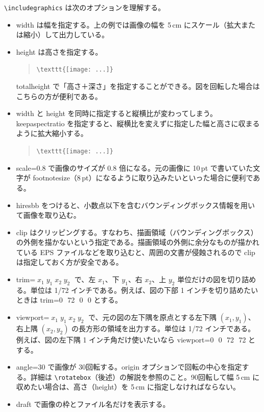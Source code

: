 \verb`\includegraphics` は次のオプションを理解する。
\begin{itemize}\setlength{\leftskip}{-1.00zw}%
\item width は幅を指定する。上の例では画像の幅を 5\,cm にスケール（拡大または縮小）して出力している。
\item height は高さを指定する。
  \begin{quote}
    \verb'\texttt{[image: ...]}'
  \end{quote}
  totalheight で「高さ＋深さ」を指定することができる。図を回転した場合はこちらの方が便利である。
\item width と height を同時に指定すると縦横比が変わってしまう。keepaspectratio を指定すると、縦横比を変えずに指定した幅と高さに収まるように拡大縮小する。
  \begin{quote}
    \verb'\texttt{[image: ...]}'
  \end{quote}
\item scale=0.8 で画像のサイズが 0.8 倍になる。元の画像に 10\,pt で書いていた文字が footnotesize（8\,pt）になるように取り込みたいといった場合に便利である。
\item hiresbb をつけると、小数点以下を含むバウンディングボックス情報を用いて画像を取り込む。
\item clip はクリッピングする。すなわち、描画領域（バウンディングボックス）の外側を描かないという指定である。描画領域の外側に余分なものが描かれている EPS ファイルなどを取り込むと、周囲の文書が侵蝕されるので clip は指定しておく方が安全である。
\item trim=$\;x_{1}\;y_{1}\;x_{2}\;y_{2}\;$ で、左 $x_{1}$、下 $y_{1}$、右 $x_{2}$、上 $y_{2}$ 単位だけの図を切り詰める。単位は 1/72 インチである。例えば、図の下部 1 インチを切り詰めたいときは trim=0\,~72\,~0\,~0 とする。
\item viewport=$\;x_{1}\;y_{1}\;x_{2}\;y_{2}\;$ で、元の図の左下隅を原点とする左下隅 $(x_{1},y_{1})$、右上隅 $(x_{2},y_{2})$ の長方形の領域を出力する。単位は 1/72 インチである。例えば、図の左下隅 1 インチ角だけ使いたいなら viewport=0\,~0\,~72\,~72 とする。
\item angle=30 で画像が 30\textdegree{}回転する。origin オプションで回転の中心を指定する。詳細は \verb`\rotatebox`（後述）の解説を参照のこと。90\textdegree{}回転して幅 5\,cm に収めたい場合は、高さ（height）を 5\,cm に指定しなければならない。
\item draft で画像の枠とファイル名だけを表示する。
\end{itemize}
